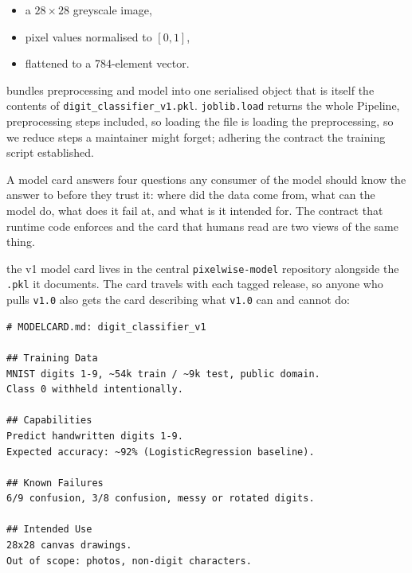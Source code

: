 \begin{itemize}
    \item a $28 \times 28$ greyscale image,
    \item pixel values normalised to $[0, 1]$,
    \item flattened to a 784-element vector.
\end{itemize}


 bundles preprocessing and model into one
serialised object that is itself the contents of \texttt{digit\_classifier\_v1.pkl}.
\texttt{joblib.load} returns the whole Pipeline, preprocessing steps
included, so loading the file is loading the preprocessing, so we reduce steps a maintainer might
forget; adhering the contract the
training script established.


A model card answers four questions any consumer of the model should know
the answer to before they trust it: where did the data come from, what
can the model do, what does it fail at, and what is it intended for.
The contract that runtime code enforces and the card that humans read
are two views of the same thing.


 the v1 model card lives in the central
\texttt{pixelwise-model} repository alongside the \texttt{.pkl} it
documents.
The card travels with each tagged release, so anyone who pulls
\texttt{v1.0} also gets the card describing what \texttt{v1.0} can and
cannot do:

\begin{verbatim}
# MODELCARD.md: digit_classifier_v1

## Training Data
MNIST digits 1-9, ~54k train / ~9k test, public domain.
Class 0 withheld intentionally.

## Capabilities
Predict handwritten digits 1-9.
Expected accuracy: ~92% (LogisticRegression baseline).

## Known Failures
6/9 confusion, 3/8 confusion, messy or rotated digits.

## Intended Use
28x28 canvas drawings.
Out of scope: photos, non-digit characters.
\end{verbatim}

